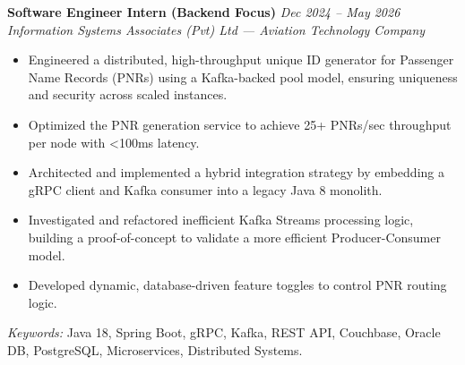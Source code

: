 \textbf{Software Engineer Intern (Backend Focus)} \hfill \textit{Dec 2024 – May 2026} \\
\textit{Information Systems Associates (Pvt) Ltd — Aviation Technology Company}

\begin{itemize}[leftmargin=*]
    \item Engineered a distributed, high-throughput unique ID generator for Passenger Name Records (PNRs) using a Kafka-backed pool model, ensuring uniqueness and security across scaled instances.
    \item Optimized the PNR generation service to achieve 25+ PNRs/sec throughput per node with <100ms latency.
    \item Architected and implemented a hybrid integration strategy by embedding a gRPC client and Kafka consumer into a legacy Java 8 monolith.
    \item Investigated and refactored inefficient Kafka Streams processing logic, building a proof-of-concept to validate a more efficient Producer-Consumer model.
    \item Developed dynamic, database-driven feature toggles to control PNR routing logic.
\end{itemize}

\textit{Keywords:} Java 18, Spring Boot, gRPC, Kafka, REST API, Couchbase, Oracle DB, PostgreSQL, Microservices, Distributed Systems.
